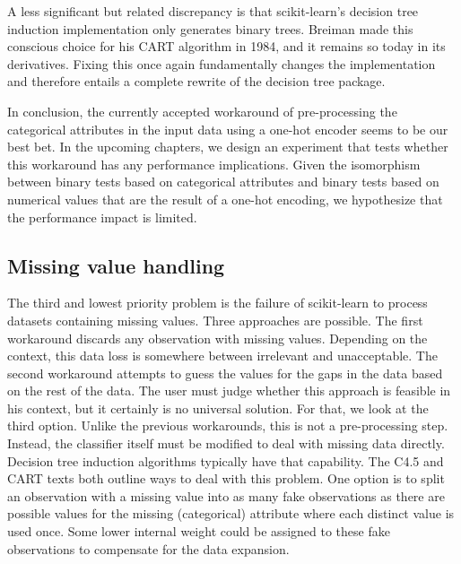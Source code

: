 A less significant but related discrepancy is that scikit-learn's decision tree induction implementation only generates binary trees. Breiman made this conscious choice for his CART algorithm in 1984, and it remains so today in its derivatives. Fixing this once again fundamentally changes the implementation and therefore entails a complete rewrite of the decision tree package.

In conclusion, the currently accepted workaround of pre-processing the categorical attributes in the input data using a one-hot encoder seems to be our best bet. In the upcoming chapters, we design an experiment that tests whether this workaround has any performance implications. Given the isomorphism between binary tests based on categorical attributes and binary tests based on numerical values that are the result of a one-hot encoding, we hypothesize that the performance impact is limited.


\subsection{Missing value handling}
The third and lowest priority problem is the failure of scikit-learn to process datasets containing missing values. Three approaches are possible. The first workaround discards any observation with missing values. Depending on the context, this data loss is somewhere between irrelevant and unacceptable. The second workaround attempts to guess the values for the gaps in the data based on the rest of the data. The user must judge whether this approach is feasible in his context, but it certainly is no universal solution. For that, we look at the third option. Unlike the previous workarounds, this is not a pre-processing step. Instead, the classifier itself must be modified to deal with missing data directly. Decision tree induction algorithms typically have that capability. The C4.5 and CART texts both outline ways to deal with this problem. One option is to split an observation with a missing value into as many fake observations as there are possible values for the missing (categorical) attribute where each distinct value is used once. Some lower internal weight could be assigned to these fake observations to compensate for the data expansion.

